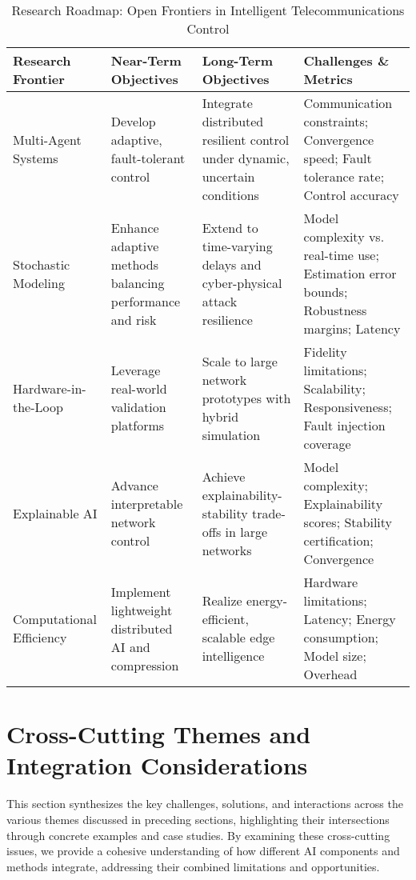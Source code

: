 \documentclass[sigconf]{acmart}
\begin{document}
\begin{table*}[htbp]
\centering
\caption{Research Roadmap: Open Frontiers in Intelligent Telecommunications Control}
\label{tab:research_roadmap}
\begin{adjustbox}{max width=\textwidth}
\begin{tabular}{@{}llll@{}}
\toprule
\textbf{Research Frontier} & \textbf{Near-Term Objectives} & \textbf{Long-Term Objectives} & \textbf{Challenges \& Metrics} \\ \midrule
Multi-Agent Systems & Develop adaptive, fault-tolerant control & Integrate distributed resilient control under dynamic, uncertain conditions & Communication constraints; Convergence speed; Fault tolerance rate; Control accuracy \\[6pt]
Stochastic Modeling & Enhance adaptive methods balancing performance and risk & Extend to time-varying delays and cyber-physical attack resilience & Model complexity vs. real-time use; Estimation error bounds; Robustness margins; Latency \\[6pt]
Hardware-in-the-Loop & Leverage real-world validation platforms & Scale to large network prototypes with hybrid simulation & Fidelity limitations; Scalability; Responsiveness; Fault injection coverage \\[6pt]
Explainable AI & Advance interpretable network control & Achieve explainability-stability trade-offs in large networks & Model complexity; Explainability scores; Stability certification; Convergence \\[6pt]
Computational Efficiency & Implement lightweight distributed AI and compression & Realize energy-efficient, scalable edge intelligence & Hardware limitations; Latency; Energy consumption; Model size; Overhead \\ \bottomrule
\end{tabular}
\end{adjustbox}
\end{table*}

\section{Cross-Cutting Themes and Integration Considerations}

This section synthesizes the key challenges, solutions, and interactions across the various themes discussed in preceding sections, highlighting their intersections through concrete examples and case studies. By examining these cross-cutting issues, we provide a cohesive understanding of how different AI components and methods integrate, addressing their combined limitations and opportunities.
\end{document}
